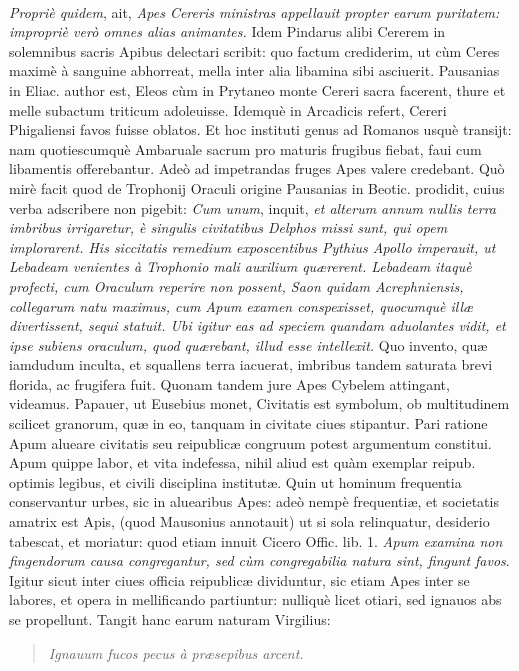 \documentclass[a4paper, 11pt, oneside, polutonikogreek, latin]{article}
\begin{document}
\paragraph{}
\emph{Propriè quidem}, ait, \emph{Apes Cereris ministras appellauit propter earum puritatem: impropriè verò omnes alias animantes.} Idem Pindarus alibi Cererem in solemnibus sacris Apibus delectari scribit: quo factum crediderim, ut cùm Ceres maximè à sanguine abhorreat, mella inter alia libamina sibi asciuerit. Pausanias in Eliac. author est, Eleos cùm in Prytaneo monte Cereri sacra facerent, thure et melle subactum triticum adoleuisse. Idemquè in Arcadicis refert, Cereri Phigaliensi favos fuisse oblatos. Et hoc instituti genus ad Romanos usquè transijt: nam quotiescumquè Ambaruale sacrum pro maturis frugibus fiebat, faui cum libamentis offerebantur. Adeò ad impetrandas fruges Apes valere credebant. Quò mirè facit quod de Trophonij Oraculi origine Pausanias in Beotic. prodidit, cuius verba adscribere non pigebit: \emph{Cum unum}, inquit, \emph{et alterum annum nullis terra imbribus irrigaretur, è singulis civitatibus Delphos missi sunt, qui opem implorarent. His siccitatis remedium exposcentibus Pythius Apollo imperauit, ut Lebadeam venientes à Trophonio mali auxilium quærerent. Lebadeam itaquè profecti, cum Oraculum reperire non possent, Saon quidam Acrephniensis, collegarum natu maximus, cum Apum examen conspexisset, quocumquè illæ divertissent, sequi statuit. Ubi igitur eas ad speciem quandam aduolantes vidit, et ipse subiens oraculum, quod quærebant, illud esse intellexit.} Quo invento, quæ iamdudum inculta, et squallens terra iacuerat, imbribus tandem saturata brevi florida, ac frugifera fuit. Quonam tandem jure Apes Cybelem attingant, videamus. Papauer, ut Eusebius monet, Civitatis est symbolum, ob multitudinem scilicet granorum, quæ in eo, tanquam in civitate ciues stipantur. Pari ratione Apum alueare civitatis seu reipublicæ congruum potest argumentum constitui. Apum quippe labor, et vita indefessa, nihil aliud est quàm exemplar reipub. optimis legibus, et civili disciplina institutæ. Quin ut hominum frequentia conservantur urbes, sic in aluearibus Apes: adeò nempè frequentiæ, et societatis amatrix est Apis, (quod Mausonius annotauit) ut si sola relinquatur, desiderio tabescat, et moriatur: quod etiam innuit Cicero Offic. lib. 1. \emph{Apum examina non fingendorum causa congregantur, sed cùm congregabilia natura sint, fingunt favos}. Igitur sicut inter ciues officia reipublicæ dividuntur, sic etiam Apes inter se labores, et opera in mellificando partiuntur: nulliquè licet otiari, sed ignauos abs se propellunt. Tangit hanc earum naturam Virgilius:
\begin{quote}
\emph{Ignauum fucos pecus à præsepibus arcent.}
\end{quote}
\vspace*{-4mm}
\end{document}
